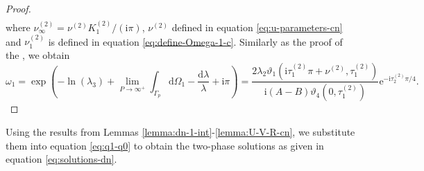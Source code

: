 \documentclass[11pt,reqno]{amsart}
\newcommand{\ii}{\mathrm{i}}
\newcommand{\ee}{\mathrm{e}}
\newcommand{\dd}{\mathrm{d}}
\numberwithin{equation}{section}
\begin{document}
\begin{proof}
\begin{equation}
\begin{split}
		\end{split}
	\end{equation}
	where $ \nu^{(2)} _{\infty}= \nu^{(2)}   K^{(2)}_1/(\ii \pi )$, $ \nu^{(2)} $ defined in equation \eqref{eq:u-parameters-cn} and $\nu^{(2)}_1$ is defined in equation \eqref{eq:define-Omega-1-c}.
	Similarly as the proof of the , we obtain 
	\begin{equation}\nonumber
		\omega_1=\exp\left(-\ln(\lambda_3)+\lim_{ P\rightarrow \infty^{+}}\int_{\Gamma_p}\dd\Omega_1-\frac{\dd \lambda}{\lambda}+\ii \pi \right)
		=\frac{2\lambda_2\vartheta_1(\ii \tau^{(2)} _1\pi+  \nu^{(2)} , \tau^{(2)} _1)}{\ii (A-B)\vartheta_4(0, \tau^{(2)} _1)}\ee^{-\ii  \tau^{(2)} _2 \pi/4}. 
	\end{equation}
\end{proof}

Using the results from Lemmas \ref{lemma:dn-1-int}-\ref{lemma:U-V-R-cn}, we substitute them into equation \eqref{eq:q1-q0} to obtain the two-phase solutions as given in equation \eqref{eq:solutions-dn}.
\end{document}
